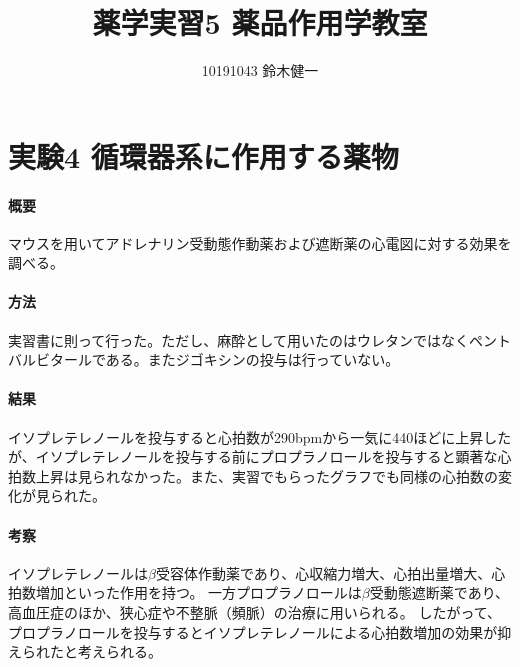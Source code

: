 \documentclass[a4paper,papersize,dvipdfmx]{jsarticle}
\begin{document}
\title{薬学実習5 薬品作用学教室}
\author{10191043 鈴木健一}
\date{}
\maketitle



\part*{実験4 循環器系に作用する薬物}


\subsection*{概要}
マウスを用いてアドレナリン受動態作動薬および遮断薬の心電図に対する効果を調べる。

\subsection*{方法}
実習書に則って行った。ただし、麻酔として用いたのはウレタンではなくペントバルビタールである。またジゴキシンの投与は行っていない。

\subsection*{結果}
イソプレテレノールを投与すると心拍数が290bpmから一気に440ほどに上昇したが、イソプレテレノールを投与する前にプロプラノロールを投与すると顕著な心拍数上昇は見られなかった。また、実習でもらったグラフでも同様の心拍数の変化が見られた。

\subsection*{考察}
イソプレテレノールは$\beta$受容体作動薬であり、心収縮力増大、心拍出量増大、心拍数増加といった作用を持つ。
一方プロプラノロールは$\beta$受動態遮断薬であり、高血圧症のほか、狭心症や不整脈（頻脈）の治療に用いられる。
したがって、プロプラノロールを投与するとイソプレテレノールによる心拍数増加の効果が抑えられたと考えられる。
\end{document}
